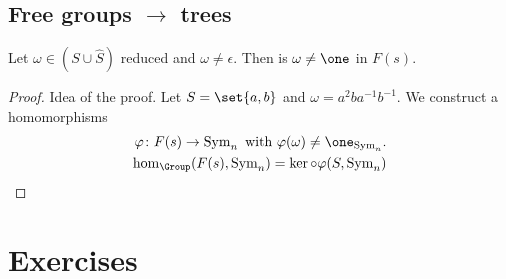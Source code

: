 \subsection{Free groups $\to$ trees}
\begin{conclusion}[title]
	Let $\omega \in (S \cup \hat{S})$ reduced and $\omega \neq \epsilon$. Then is $\omega \neq \one$ in $F(s)$.
\end{conclusion}
\begin{proof}
	Idea of the proof. Let $S = \set{a,b}$ and $\omega = a^2ba^{-1}b^{-1}$. We construct a homomorphisms
	\begin{align*}
		\phi\colon F(s) \to \Sym_n \with \phi(\omega) \neq \one_{\Sym_n}.\\
		\hom_{\Group}(F(s), \Sym_n) = \ker \circ \phi(S,\Sym_n)
	\end{align*}
\end{proof}

\section{Exercises}